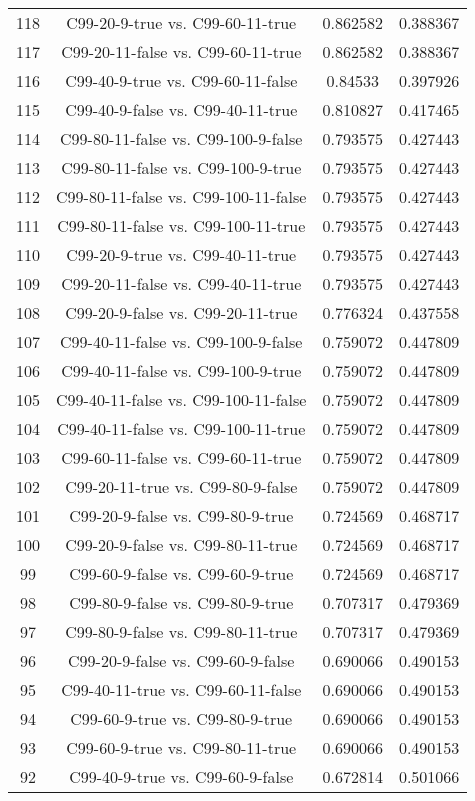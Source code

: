 \documentclass[a4paper,10pt]{article}
\begin{document}
\begin{landscape}
\begin{table}[!htp]
\begin{tabular}{cccc}
118&C99-20-9-true vs. C99-60-11-true&0.862582&0.388367\\
117&C99-20-11-false vs. C99-60-11-true&0.862582&0.388367\\
116&C99-40-9-true vs. C99-60-11-false&0.84533&0.397926\\
115&C99-40-9-false vs. C99-40-11-true&0.810827&0.417465\\
114&C99-80-11-false vs. C99-100-9-false&0.793575&0.427443\\
113&C99-80-11-false vs. C99-100-9-true&0.793575&0.427443\\
112&C99-80-11-false vs. C99-100-11-false&0.793575&0.427443\\
111&C99-80-11-false vs. C99-100-11-true&0.793575&0.427443\\
110&C99-20-9-true vs. C99-40-11-true&0.793575&0.427443\\
109&C99-20-11-false vs. C99-40-11-true&0.793575&0.427443\\
108&C99-20-9-false vs. C99-20-11-true&0.776324&0.437558\\
107&C99-40-11-false vs. C99-100-9-false&0.759072&0.447809\\
106&C99-40-11-false vs. C99-100-9-true&0.759072&0.447809\\
105&C99-40-11-false vs. C99-100-11-false&0.759072&0.447809\\
104&C99-40-11-false vs. C99-100-11-true&0.759072&0.447809\\
103&C99-60-11-false vs. C99-60-11-true&0.759072&0.447809\\
102&C99-20-11-true vs. C99-80-9-false&0.759072&0.447809\\
101&C99-20-9-false vs. C99-80-9-true&0.724569&0.468717\\
100&C99-20-9-false vs. C99-80-11-true&0.724569&0.468717\\
99&C99-60-9-false vs. C99-60-9-true&0.724569&0.468717\\
98&C99-80-9-false vs. C99-80-9-true&0.707317&0.479369\\
97&C99-80-9-false vs. C99-80-11-true&0.707317&0.479369\\
96&C99-20-9-false vs. C99-60-9-false&0.690066&0.490153\\
95&C99-40-11-true vs. C99-60-11-false&0.690066&0.490153\\
94&C99-60-9-true vs. C99-80-9-true&0.690066&0.490153\\
93&C99-60-9-true vs. C99-80-11-true&0.690066&0.490153\\
92&C99-40-9-true vs. C99-60-9-false&0.672814&0.501066\\

\end{tabular}
\end{table}
\end{landscape}
\end{document}
